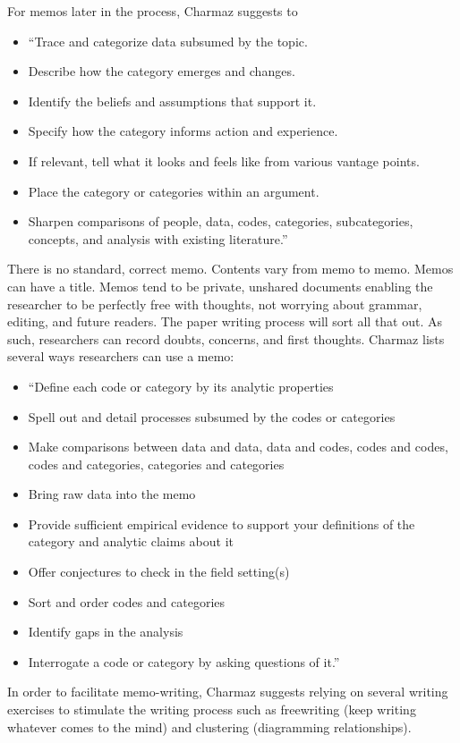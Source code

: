 For memos later in the process, Charmaz suggests to
\begin{itemize}
\item ``Trace and categorize data subsumed by the topic.
\item Describe how the category emerges and changes. 
\item Identify the beliefs and assumptions that support it. 
\item Specify how the category informs action and experience. 
\item If relevant, tell what it looks and feels like from various vantage points. 
\item Place the category or categories within an argument. 
\item Sharpen comparisons of people, data, codes, categories, subcategories, concepts, and analysis with existing literature.'' \cite{Charmaz}
\end{itemize}

There is no standard, correct memo. Contents vary from memo to memo. Memos can have a title. Memos tend to be private, unshared documents enabling the researcher to be perfectly free with thoughts, not worrying about grammar, editing, and future readers. The paper writing process will sort all that out. As such, researchers can record doubts, concerns, and first thoughts. Charmaz lists several ways researchers can use a memo:
\begin{itemize}
\item ``Define each code or category by its analytic properties
\item Spell out and detail processes subsumed by the codes or categories
\item Make comparisons between data and data, data and codes, codes and codes, codes and categories, categories and categories
\item Bring raw data into the memo
\item Provide sufficient empirical evidence to support your definitions of the category and analytic claims about it
\item Offer conjectures to check in the field setting(s)
\item Sort and order codes and categories
\item Identify gaps in the analysis
\item Interrogate a code or category by asking questions of it.'' \cite{Charmaz}
\end{itemize}

In order to facilitate memo-writing, Charmaz suggests relying on several writing exercises to stimulate the writing process such as freewriting (keep writing whatever comes to the mind) and clustering (diagramming relationships).

